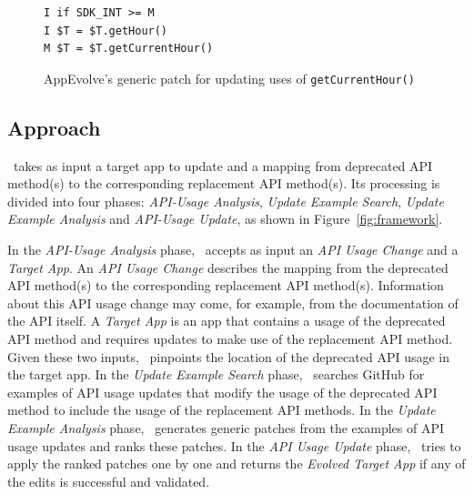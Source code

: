 
\begin{figure}[htb]
	\centering
	\begin{lstlisting}[language=text,numbers=none]
I if SDK_INT >= M
I $T = $T.getHour()
M $T = $T.getCurrentHour()
	\end{lstlisting}
	\caption{AppEvolve's generic patch for updating uses of \texttt{get\-Current\-Hour()}}
	\label{fig:deprecated_api_update_edits}
\end{figure}


\subsection{Approach}
\toolname\ takes as input a target app to update and a mapping from
deprecated API method(s) to the corresponding replacement API method(s).
Its processing is divided into four phases: {\em API-Usage Analysis}, {\em
  Update Example Search}, {\em Update Example Analysis} and {\em API-Usage
  Update}, as shown in Figure~\ref{fig:framework}.

In the {\em API-Usage Analysis} phase, \toolname\ accepts as input an {\em
  API Usage Change} and a {\em Target App}. An {\em API Usage Change}
describes the mapping from the deprecated API method(s) to the
corresponding replacement API method(s).  Information about this API usage
change may come, for example, from the documentation of the API itself. A
{\em Target App} is an app that contains a usage of the deprecated API
method and requires updates to make use of the replacement API
method. Given these two inputs, \toolname\ pinpoints the location of the
deprecated API usage in the target app. In the {\em Update Example
  Search} phase, \toolname\ searches GitHub for examples of API usage
updates that modify the usage of the deprecated API method to include the
usage of the replacement API methods. In the {\em Update Example Analysis}
phase, \toolname\ generates generic patches from the examples of API usage
updates and ranks these patches. In the {\em API Usage Update} phase,
\toolname\ tries to apply the ranked patches one by one and returns the
                 {\em Evolved Target App} if any of the edits is successful
                 and validated.

